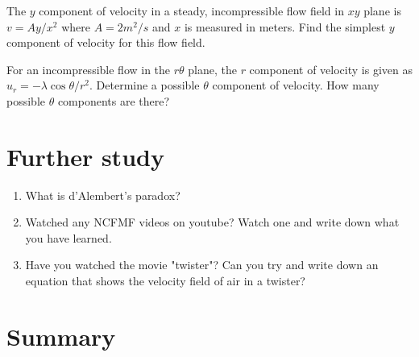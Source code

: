 
\begin{question}
The $y$ component of velocity in a steady, incompressible flow field in $xy$ plane is $v = {Ay/x^2}$ where $A=2m^2/s$ and $x$ is measured in meters. Find the simplest $y$ component of velocity for this flow field.
\end{question}
\begin{solution}[print]
\end{solution}


\begin{question}
For an incompressible flow in the $r\theta$ plane, the $r$ component of velocity is given as $u_r = -{\lambda \cos\theta/r^2}$. Determine a possible $\theta$ component of velocity. How many possible $\theta$ components are there?
\end{question}
\begin{solution}[print]
\end{solution}
  

\section{Further study}

\begin{enumerate}

\item What is d'Alembert's paradox?
 
\item Watched any NCFMF videos on youtube? Watch one and write down what you have learned. 

\item Have you watched the movie "twister"? Can you try and write down an equation that shows the velocity field of air in a twister?

\end{enumerate}


\section{Summary}

